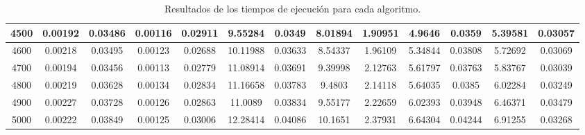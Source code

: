 \documentclass[conference]{IEEEtran}
\begin{document}
\begin{table}[!ht]
\begin{tabular}{|c|c|c|c|c|c|c|c|c|c|c|c|c|}
\hline
4500 & 0.00192 & 0.03486 & 0.00116 & 0.02911 & 9.55284 & 0.0349 & 8.01894 & 1.90951 &4.9646 & 0.0359 & 5.39581 & 0.03057 \\
\hline
4600 & 0.00218 & 0.03495 & 0.00123 & 0.02688 & 10.11988 & 0.03633 & 8.54337 & 1.96109 &5.34844 & 0.03808 & 5.72692 & 0.03069 \\
\hline
4700 & 0.00194 & 0.03456 & 0.00113 & 0.02779 & 11.08914 & 0.03691 & 9.39998 & 2.12763 &5.61797 & 0.03763 & 5.83767 & 0.03039 \\
\hline
4800 & 0.00219 & 0.03628 & 0.00134 & 0.02834 & 11.16658 & 0.03783 & 9.4803 & 2.14118 &5.64035 & 0.0385 & 6.02284 & 0.03249 \\
\hline
4900 & 0.00227 & 0.03728 & 0.00126 & 0.02863 & 11.0089 & 0.03834 & 9.55177 & 2.22659 &6.02393 & 0.03948 & 6.46371 & 0.03479 \\
\hline
5000 & 0.00222 & 0.03849 & 0.00125 & 0.03006 & 12.28414 & 0.04086 & 10.1651 & 2.37931 &6.64304 & 0.04244 & 6.91255 & 0.03268 \\
\hline


\end{tabular}
\caption{Resultados de los tiempos de ejecuci\'on para cada algoritmo.}
\end{table}
\end{document}
